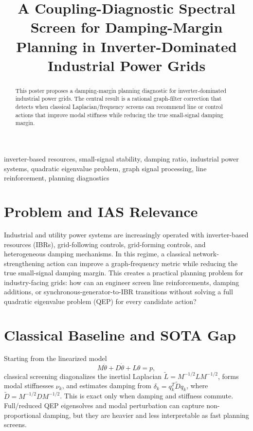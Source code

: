\documentclass[conference]{IEEEtran}
\title{A Coupling-Diagnostic Spectral Screen for Damping-Margin Planning in Inverter-Dominated Industrial Power Grids}
\author{\IEEEauthorblockN{Jorge L. Mayorga Taborda}
\IEEEauthorblockA{Universidad de los Andes\\
Bogota, Colombia}}
\newcommand{\Lt}{\widetilde L}
\newcommand{\Dt}{\widetilde D}
\begin{document}
\maketitle

\begin{abstract}
This poster proposes a damping-margin planning diagnostic for inverter-dominated industrial power grids. The central result is a rational graph-filter correction that detects when classical Laplacian/frequency screens can recommend line or control actions that improve modal stiffness while reducing the true small-signal damping margin.
\end{abstract}

\begin{IEEEkeywords}
inverter-based resources, small-signal stability, damping ratio, industrial power systems, quadratic eigenvalue problem, graph signal processing, line reinforcement, planning diagnostics
\end{IEEEkeywords}

\section*{Problem and IAS Relevance}
Industrial and utility power systems are increasingly operated with inverter-based resources (IBRs), grid-following controls, grid-forming controls, and heterogeneous damping mechanisms. In this regime, a classical network-strengthening action can improve a graph-frequency metric while reducing the true small-signal damping margin. This creates a practical planning problem for industry-facing grids: how can an engineer screen line reinforcements, damping additions, or synchronous-generator-to-IBR transitions without solving a full quadratic eigenvalue problem (QEP) for every candidate action?

\section*{Classical Baseline and SOTA Gap}
Starting from the linearized model
\begin{equation}
M\ddot{\theta}+D\dot{\theta}+L\theta=p,
\end{equation}
classical screening diagonalizes the inertial Laplacian \(\Lt=M^{-1/2}LM^{-1/2}\), forms modal stiffnesses \(\nu_k\), and estimates damping from \(\delta_k=q_k^T\Dt q_k\), where \(\Dt=M^{-1/2}DM^{-1/2}\). This is exact only when damping and stiffness commute. Full/reduced QEP eigensolves and modal perturbation can capture non-proportional damping, but they are heavier and less interpretable as fast planning screens.
\end{document}
